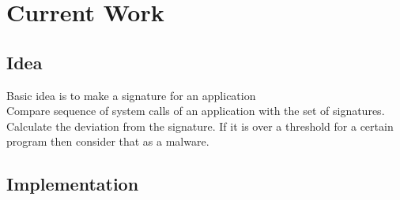 \section{Current Work}

\subsection{Idea}
Basic idea is to make a signature for an application \\
Compare sequence of system calls of an application with the set of signatures. \\
Calculate the deviation from the signature. If it is over a threshold for a certain program then consider that as a malware. \\

\subsection{Implementation}

